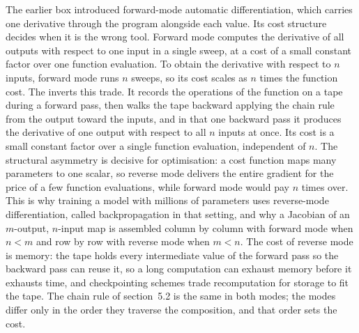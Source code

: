 \begin{mastery}
The earlier box introduced forward-mode automatic differentiation, which
carries one derivative through the program alongside each value. Its cost
structure decides when it is the wrong tool. Forward mode computes the
derivative of all outputs with respect to one input in a single sweep, at
a cost of a small constant factor over one function evaluation. To obtain
the derivative with respect to $n$ inputs, forward mode runs $n$ sweeps,
so its cost scales as $n$ times the function cost. The
 inverts this trade. It records the operations of
the function on a tape during a forward pass, then walks the tape
backward applying the chain rule from the output toward the inputs, and
in that one backward pass it produces the derivative of one output with
respect to all $n$ inputs at once. Its cost is a small constant factor
over a single function evaluation, independent of $n$. The structural
asymmetry is decisive for optimisation: a cost function maps many
parameters to one scalar, so reverse mode delivers the entire gradient
for the price of a few function evaluations, while forward mode would
pay $n$ times over. This is why training a model with millions of
parameters uses reverse-mode differentiation, called backpropagation in
that setting, and why a Jacobian of an $m$-output, $n$-input map is
assembled column by column with forward mode when $n < m$ and row by row
with reverse mode when $m < n$. The cost of reverse mode is memory: the
tape holds every intermediate value of the forward pass so the backward
pass can reuse it, so a long computation can exhaust memory before it
exhausts time, and checkpointing schemes trade recomputation for storage
to fit the tape. The chain rule of section~5.2 is the same in both modes;
the modes differ only in the order they traverse the composition, and
that order sets the cost.


\end{mastery}
